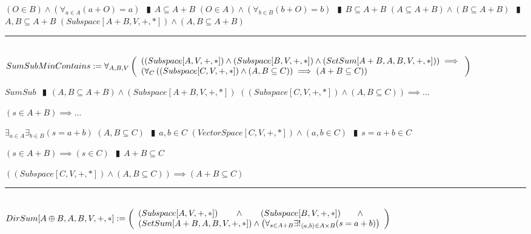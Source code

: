 \documentclass{book}
\newcommand{\abr}{:=}
\newcommand{\pipe}{$\phantom{(}\vrectangleblack\phantom{)}$}
\newcommand{\pr}[1]{\left(#1\right)}
\begin{document}
\begin{shaded}
\begin{enumerate}
  \lit $(O \in B) \land \pr{\forall_{a \in A}(a + O) = a}$ \pipe $A \subseteq A + B$
  \lit $(O \in A) \land \pr{\forall_{b \in B}(b + O) = b}$ \pipe $B \subseteq A + B$
  \lit $(A \subseteq A + B) \land (B \subseteq A + B)$ \pipe $A, B \subseteq A + B$
  \lit $(Subspace[A + B, V, + ,*]) \land (A, B \subseteq A + B)$
\end{enumerate} \vspace{.75mm} \hrule \vspace{.75mm} \ \\

$SumSubMinContains \abr \forall_{A, B, V}\left(\begin{array}{ll}
  \pr{(Subspace[A, V, +, *]) \land (Subspace[B, V, +, *]) \land (SetSum[A + B, A, B, V, +, *])} \hfill \implies \hfill \\
  \pr{\forall_{C}\pr{(Subspace[C, V, + ,*]) \land (A, B \subseteq C)} \implies (A + B \subseteq C)}
\end{array}\right)$
\begin{enumerate}
  \lit $SumSub$ \pipe $(A, B \subseteq A + B) \land (Subspace[A + B, V, + ,*])$
  \lit $\pr{(Subspace[C, V, + ,*]) \land (A, B \subseteq C)} \implies \ldots$
  \begin{enumerate}
    \lit $(s \in A + B) \implies \ldots$
    \begin{enumerate}
      \lit $\exists_{a \in A} \exists_{b \in B}(s = a + b)$
      \lit $(A, B \subseteq C)$ \pipe $a, b \in C$
      \lit $(VectorSpace[C, V, + ,*]) \land (a, b \in C)$ \pipe $s = a + b \in C$
    \end{enumerate}
    \lit $(s \in A + B) \implies (s \in C)$ \pipe $A + B \subseteq C$
  \end{enumerate}
  \lit $\pr{(Subspace[C, V, + ,*]) \land (A, B \subseteq C)} \implies (A + B \subseteq C)$
\end{enumerate} \vspace{.75mm} \hrule \vspace{.75mm} \ \\ 

$DirSum[A \oplus B, A, B, V, +, *] \abr \left(\begin{array}{ll}
  (Subspace[A, V, +, *]) \hfill \land \hfill (Subspace[B, V, +, *]) \hfill \land \hfill \\
  (SetSum[A + B, A, B, V, +, *]) \hfill \land \hfill \pr{\forall_{s \in A + B} \exists!_{\langle a, b \rangle \in A \times B}(s = a + b)}
\end{array}\right)$ \\


\end{shaded}
\end{document}
